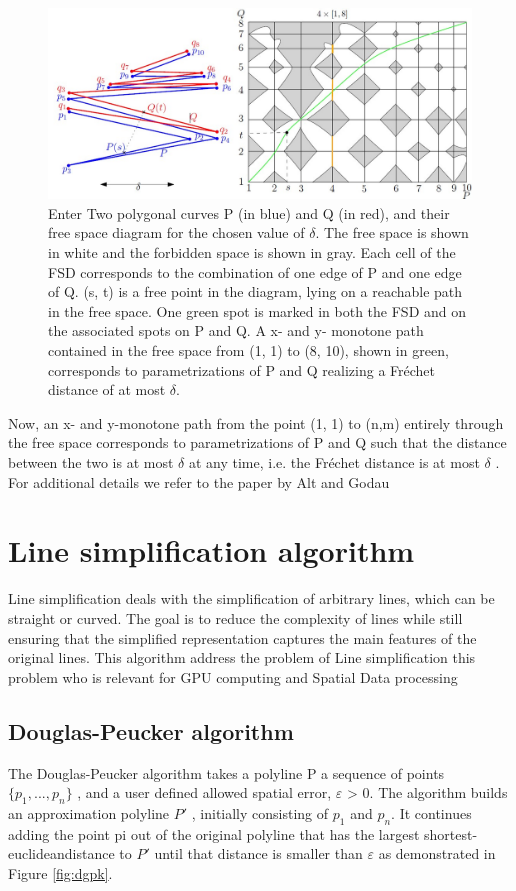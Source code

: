 \documentclass[twoside,12pt, a4paper]{report}
\begin{document}
\begin{figure}
    \centering
    \includegraphics[width=1.0\linewidth]{figures/Figure.jpg}
    \caption{\cite{kerkhof2022algorithmic} Enter Two polygonal curves P (in blue) and Q (in red), and their free space
diagram for the chosen value of  $ \delta $. The free space is shown in white and the forbidden
space is shown in gray. Each cell of the FSD corresponds to the combination of
one edge of P and one edge of Q. (s, t) is a free point in the diagram, lying on a
reachable path in the free space. One green spot is marked in both the FSD and on
the associated spots on P and Q. A x- and y- monotone path contained in the free
space from (1, 1) to (8, 10), shown in green, corresponds to parametrizations of P and
Q realizing a Fréchet distance of at most  $ \delta $.}
    \label{fig:fsd}
\end{figure}

Now, an x- and y-monotone path from the point (1, 1) to (n,m) entirely through
the free space corresponds to parametrizations of P and Q such that the distance
between the two is at most $ \delta $  at any time, i.e. the Fréchet distance is at most $ \delta $ .
For additional details we refer to the paper by Alt and Godau \cite{AltGodau}

\section{Line simplification algorithm}
Line simplification deals with the simplification of arbitrary lines, which can be straight or curved. The goal is to reduce the complexity of lines while still ensuring that the simplified representation captures the main features of the original lines. This algorithm address the problem of Line simplification this problem who is relevant for GPU computing and Spatial Data processing

\subsection{Douglas-Peucker algorithm}
\cite{van2017extensive}
The Douglas-Peucker algorithm  \cite{douglas1973algorithms} \cite{hershberger1994n} takes a polyline
P a sequence of points $\{p_{1},..., p_{n}\}$ , and a user defined
allowed spatial error, $\varepsilon$ > 0. The algorithm builds an
approximation polyline $P'$ , initially consisting of $p_{1}$ and
$p_{n}$. It continues adding the point pi out of the original
polyline that has the largest shortest-euclideandistance
to $P'$ until that distance is smaller than $\varepsilon$ as
demonstrated in Figure \ref{fig:dgpk}.
\end{document}
